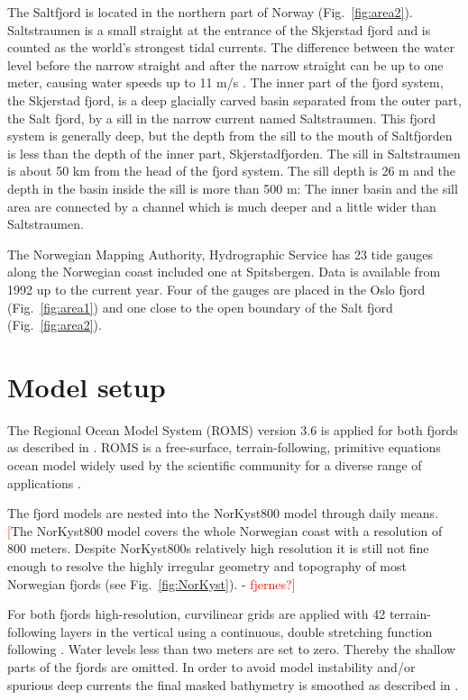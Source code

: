The Saltfjord is located in the northern part of Norway (Fig.~\ref{fig:area2}). Saltstraumen is a small straight at the entrance of the Skjerstad fjord and is counted as the world's strongest tidal currents. The difference between the water level before the narrow straight and after the narrow straight can be up to one meter, causing water speeds up to 11 m/s \cite[]{eliassen01}.
The inner part of the fjord system, the Skjerstad fjord, is a deep glacially carved basin separated from the outer part, the Salt fjord, by a sill in the narrow current named Saltstraumen. This fjord system is generally deep, but the depth from the sill to the mouth of Saltfjorden is less than the depth of the inner part, Skjerstadfjorden. The sill in Saltstraumen is about 50 km from the head of the fjord system. The sill depth is 26 m and the depth in the basin inside the sill is more than 500 m: The inner basin and the sill area are connected by a channel which is much deeper and a little wider than Saltstraumen.

The Norwegian Mapping Authority, Hydrographic Service has 23 tide gauges along the Norwegian coast included one at Spitsbergen. Data is available from 1992 up to the current year. Four of the gauges are placed in the Oslo fjord  (Fig.~\ref{fig:area1}) and one close to the open boundary of the Salt fjord (Fig.~\ref{fig:area2}).


\section{Model setup}

The Regional Ocean Model System (ROMS) version 3.6 is applied for both fjords as described in \cite{roed16}. ROMS is a free-surface, terrain-following, primitive equations ocean model widely used by the scientific community for a diverse range of applications \cite[]{shchepetkin05,shchepetkin09,haidvogel08}. 

The fjord models are nested into the NorKyst800 model \cite[]{albretsen11} through daily means. \textcolor{Red}{[}The NorKyst800 model covers the whole Norwegian coast with a resolution of 800 meters. Despite NorKyst800s relatively high resolution it is still not fine enough to resolve the highly irregular geometry and topography of most Norwegian fjords (see Fig.~\ref{fig:NorKyst}). - \textcolor{Red}{fjernes?]}

For both fjords high-resolution, curvilinear grids are applied with 42 terrain-following layers in the vertical using a continuous, double stretching function following \cite{shchepetkin09}. Water levels less than two meters are set to zero. Thereby the shallow parts of the fjords are omitted. In order to avoid model instability and/or spurious deep currents the final masked bathymetry is smoothed as described in \cite{roed16}.

